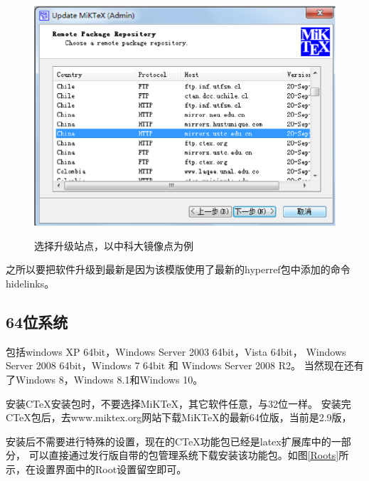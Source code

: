 \begin{figure}[th]
\centering
\includegraphics[scale=0.5]{./Pictures/set3.eps}\\
\caption{选择升级站点，以中科大镜像点为例}
\label{set3}
\end{figure}

之所以要把软件升级到最新是因为该模版使用了最新的hyperref包中添加的命令hidelinks。

\subsection{64位系统}

包括windows XP 64bit，Windows Server 2003 64bit，Vista 64bit，
Windows Server 2008 64bit，Windows 7 64bit 和 Windows Server 2008 R2。
当然现在还有了Windows 8，Windows 8.1和Windows 10。

安装CTeX安装包时，不要选择MiKTeX，其它软件任意，与32位一样。
安装完CTeX包后，去www.miktex.org网站下载MiKTeX的最新64位版，当前是2.9版，

安装后不需要进行特殊的设置，现在的CTeX功能包已经是latex扩展库中的一部分，
可以直接通过发行版自带的包管理系统下载安装该功能包。如图\ref{Roots}所示，在设置界面中的Root设置留空即可。

